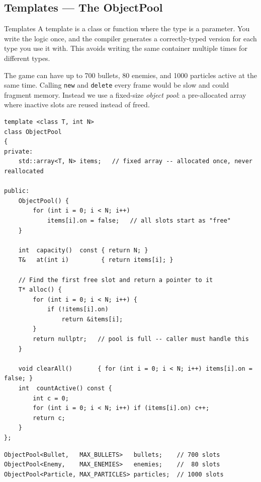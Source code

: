 \documentclass[11pt]{article}
\begin{document}
\subsection{Templates --- The ObjectPool}

\begin{conceptbox}{Templates}
A template is a class or function where the type is a parameter. You write the
logic once, and the compiler generates a correctly-typed version for each type
you use it with. This avoids writing the same container multiple times for
different types.
\end{conceptbox}

The game can have up to 700 bullets, 80 enemies, and 1000 particles active at
the same time. Calling \texttt{new} and \texttt{delete} every frame would be
slow and could fragment memory. Instead we use a fixed-size \emph{object pool}:
a pre-allocated array where inactive slots are reused instead of freed.

\begin{lstlisting}[caption={ObjectPool template class (GameData.h)}]
template <class T, int N>
class ObjectPool
{
private:
    std::array<T, N> items;   // fixed array -- allocated once, never reallocated

public:
    ObjectPool() {
        for (int i = 0; i < N; i++)
            items[i].on = false;   // all slots start as "free"
    }

    int  capacity()  const { return N; }
    T&   at(int i)         { return items[i]; }

    // Find the first free slot and return a pointer to it
    T* alloc() {
        for (int i = 0; i < N; i++) {
            if (!items[i].on)
                return &items[i];
        }
        return nullptr;   // pool is full -- caller must handle this
    }

    void clearAll()       { for (int i = 0; i < N; i++) items[i].on = false; }
    int  countActive() const {
        int c = 0;
        for (int i = 0; i < N; i++) if (items[i].on) c++;
        return c;
    }
};
\end{lstlisting}

\begin{lstlisting}[caption={Three pool instances in Game.h}]
ObjectPool<Bullet,   MAX_BULLETS>   bullets;    // 700 slots
ObjectPool<Enemy,    MAX_ENEMIES>   enemies;    //  80 slots
ObjectPool<Particle, MAX_PARTICLES> particles;  // 1000 slots
\end{lstlisting}
\end{document}
